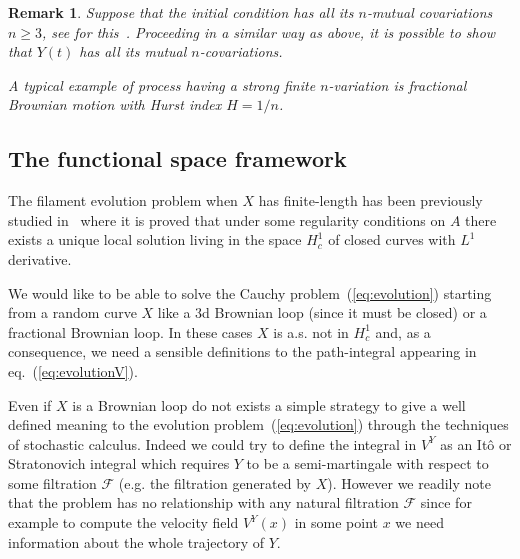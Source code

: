 \documentclass[a4paper,12pt,reqno]{amsart}
\newtheorem{remark}{Remark}
\begin{document}
\begin{remark}\label{Ncov}
Suppose that  the initial condition  has all its $n$-mutual covariations
 $n\ge 3$, see for this~\cite{er}.
Proceeding in a similar way as above, it is possible to show 
that $Y(t)$ has all its  mutual $n$-covariations.


A typical example of process having a strong finite 
$n$-variation is fractional Brownian motion with Hurst
index $H= 1/n$.
\end{remark}


\subsection{The functional space framework}

The filament evolution  problem when $X$ has finite-length has been previously studied
in~\cite{BerselliBessaih} where it is proved that under some regularity conditions
on $A$ there exists a unique local solution living in the space $H^1_c$ of
closed curves with $L^1$ derivative. 

We would like to be able to solve the Cauchy
problem~(\ref{eq:evolution}) starting from a  random curve $X$ like a
3d Brownian loop (since it must be closed) or a fractional Brownian
loop. In these cases $X$ is a.s. not in $H^1_c$ and, as a consequence, we need
 a sensible definitions to the path-integral appearing in
eq.~(\ref{eq:evolutionV}). 

 
Even if $X$ is a Brownian loop do not exists a simple strategy to give
a well defined meaning to the evolution problem~(\ref{eq:evolution})
through the techniques of stochastic calculus. Indeed we could try to
define the integral in $V^Y$ as an It\^o or Stratonovich integral
which requires $Y$ to be a semi-martingale with respect to some
filtration $\mathcal{F}$ (e.g. the filtration generated by $X$). However we readily note that the problem has
no relationship with any natural filtration $\mathcal{F}$ since for example to
compute the velocity field $V^Y(x)$ in some point $x$ we need information about the whole trajectory of $Y$. 
\end{document}
